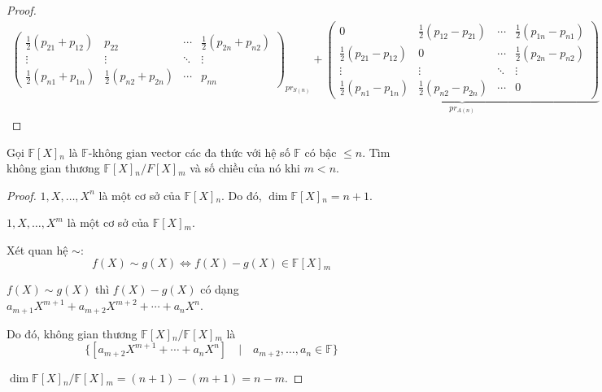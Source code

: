 \documentclass[class=linearalgebra,crop=false]{standalone}
\begin{document}
\begin{proof}
\begin{gather*}
{\begin{pmatrix}
                    \frac{1}{2}(p_{21} + p_{12}) & p_{22} & \cdots & \frac{1}{2}(p_{2n} + p_{n2}) \\
                    \vdots & \vdots & \ddots & \vdots \\
                    \frac{1}{2}(p_{n1} + p_{1n}) & \frac{1}{2}(p_{n2} + p_{2n}) & \cdots & p_{nn}
                \end{pmatrix}
            }_{pr_{S(n)}}+
            \underbrace{
                \begin{pmatrix}
                    0 & \frac{1}{2}(p_{12} - p_{21}) & \cdots & \frac{1}{2}(p_{1n} - p_{n1}) \\
                    \frac{1}{2}(p_{21} - p_{12}) & 0 & \cdots & \frac{1}{2}(p_{2n} - p_{n2}) \\
                    \vdots & \vdots & \ddots & \vdots \\
                    \frac{1}{2}(p_{n1} - p_{1n}) & \frac{1}{2}(p_{n2} - p_{2n}) & \cdots & 0
                \end{pmatrix}
            }_{pr_{A(n)}}
        \end{gather*}
\end{proof}

\begin{exercise}
    Gọi $\mathbb{F}[X]{}_{n}$ là $\mathbb{F}$-không gian vector các đa thức với hệ số $\mathbb{F}$ có bậc $\le n$. Tìm không gian thương $\mathbb{F}[X]{}_{n}/F[X]{}_{m}$ và số chiều của nó khi $m < n$.
\end{exercise}

\begin{proof}
    $1, X, \ldots, X^{n}$ là một cơ sở của $\mathbb{F}[X]{}_{n}$. Do đó, $\dim \mathbb{F}[X]{}_{n} = n + 1$.
    \par $1, X, \ldots, X^{m}$ là một cơ sở của $\mathbb{F}[X]{}_{m}$.
    \par Xét quan hệ $\sim$:
        \[ f(X)\sim g(X) \Longleftrightarrow f(X) - g(X) \in \mathbb{F}[X]{}_{m} \]
    \par $f(X) \sim g(X)$ thì $f(X) - g(X)$ có dạng $a_{m+1}X^{m+1} + a_{m+2}X^{m+2} + \cdots + a_{n}X^{n}$.
    \par Do đó, không gian thương $\mathbb{F}[X]{}_{n}/\mathbb{F}[X]{}_{m}$ là
        \[ \{ [a_{m+2}X^{m+1} + \cdots + a_{n}X^{n}] \quad\vert\quad a_{m+2}, \ldots, a_{n}\in\mathbb{F} \} \]
    \par $\dim\mathbb{F}[X]{}_{n}/\mathbb{F}[X]{}_{m} = (n + 1) - (m + 1) = n - m$.
\end{proof}
\end{document}
